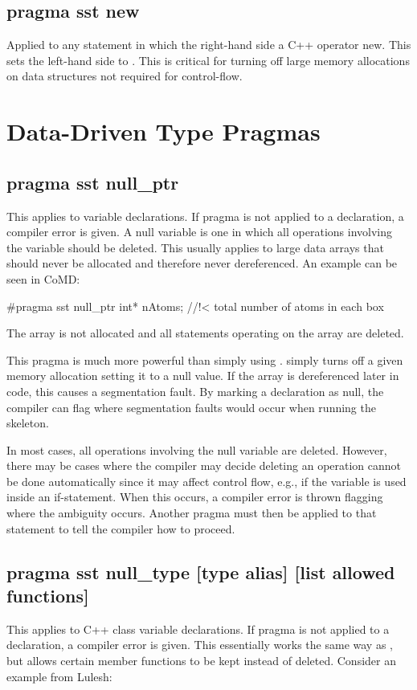 \subsection{pragma sst new}
Applied to any statement in which the right-hand side a C++ operator new. This sets the left-hand side to .
This is critical for turning off large memory allocations on data structures not required for control-flow.

\section{Data-Driven Type Pragmas}
\subsection{pragma sst null\_ptr}
This applies to variable declarations. If pragma is not applied to a declaration, a compiler error is given.
A null variable is one in which all operations involving the variable should be deleted.
This usually applies to large data arrays that should never be allocated and therefore never dereferenced.
An example can be seen in CoMD:

\begin{CppCode}
#pragma sst null_ptr
   int* nAtoms;         //!< total number of atoms in each box
\end{CppCode}
The array is not allocated and all statements operating on the array are deleted.

This pragma is much more powerful than simply using .
 simply turns off a given memory allocation setting it to a null value.
If the array is dereferenced later in code, this causes a segmentation fault.
By marking a declaration as null, the compiler can flag where segmentation faults would occur when running the skeleton.

In most cases, all operations involving the null variable are deleted.
However, there may be cases where the compiler may decide deleting an operation cannot be done automatically since
it may affect control flow, e.g., if the variable is used inside an if-statement.
When this occurs, a compiler error is thrown flagging where the ambiguity occurs.
Another pragma must then be applied to that statement to tell the compiler how to proceed.

\subsection{pragma sst null\_type [type alias] [list allowed functions]}
This applies to C++ class variable declarations. If pragma is not applied to a declaration, a compiler error is given.
This essentially works the same way as , but allows certain member functions to be kept instead of deleted.
Consider an example from Lulesh:

